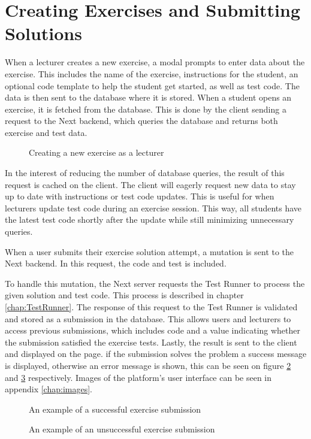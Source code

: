 \section{Creating Exercises and Submitting Solutions}
When a lecturer creates a new exercise, a modal prompts to enter data about the exercise.
This includes the name of the exercise, instructions for the student, an optional code template to help the student get started, as well as test code.
The data is then sent to the database where it is stored.
When a student opens an exercise, it is fetched from the database.
This is done by the client sending a request to the Next backend, which queries the database and returns both exercise and test data.

\begin{figure}[H]
    \centering
    \caption{Creating a new exercise as a lecturer}
    \label{fig:create_exercise}
\end{figure}

In the interest of reducing the number of database queries, the result of this request is cached on the client.
The client will eagerly request new data to stay up to date with instructions or test code updates.
This is useful for when lecturers update test code during an exercise session.
This way, all students have the latest test code shortly after the update while still minimizing unnecessary queries.

When a user submits their exercise solution attempt, a mutation is sent to the Next backend.
In this request, the code and test is included.

To handle this mutation, the Next server requests the Test Runner to process the given solution and test code.
This process is described in chapter \ref{chap:TestRunner}.
The response of this request to the Test Runner is validated and stored as a submission in the database.
This allows users and lecturers to access previous submissions, which includes code and a value indicating whether the submission satisfied the exercise tests.
Lastly, the result is sent to the client and displayed on the page.
if the submission solves the problem a success message is displayed, otherwise an error message is shown, this can be seen on figure \ref{fig:exercise_success} and \ref{fig:exercise_fail} respectively.
Images of the platform's user interface can be seen in appendix \ref{chap:images}.

\begin{figure}[H]
	\centering
	\caption{An example of a successful exercise submission}
	\label{fig:exercise_success}
\end{figure}

\begin{figure}[H]
	\centering
	\caption{An example of an unsuccessful exercise submission}
	\label{fig:exercise_fail}
\end{figure}
